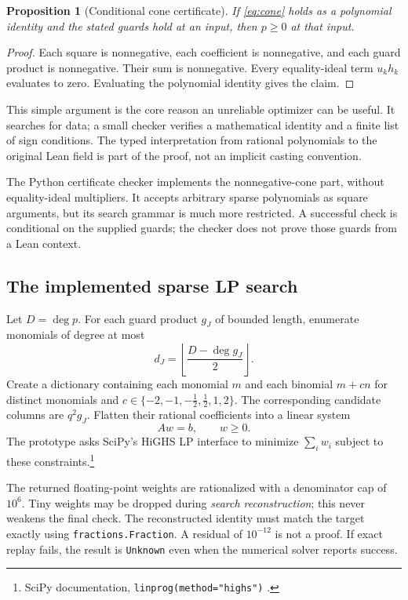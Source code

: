 \documentclass[11pt,a4paper]{article}
\newcommand{\code}[1]{\texttt{#1}}
\newtheorem{proposition}{Proposition}[section]
\begin{document}
\begin{proposition}[Conditional cone certificate]
If \eqref{eq:cone} holds as a polynomial identity and the stated guards hold at
an input, then $p\ge0$ at that input.
\end{proposition}
\begin{proof}
Each square is nonnegative, each coefficient is nonnegative, and each guard
product is nonnegative. Their sum is nonnegative. Every equality-ideal term
$u_kh_k$ evaluates to zero. Evaluating the polynomial identity gives the claim.
\end{proof}

This simple argument is the core reason an unreliable optimizer can be useful.
It searches for data; a small checker verifies a mathematical identity and a
finite list of sign conditions. The typed interpretation from rational
polynomials to the original Lean field is part of the proof, not an implicit
casting convention.

The Python certificate checker implements the nonnegative-cone part, without
equality-ideal multipliers. It accepts arbitrary sparse polynomials as square
arguments, but its search grammar is much more restricted. A successful check
is conditional on the supplied guards; the checker does not prove those guards
from a Lean context.

\subsection{The implemented sparse LP search}
Let $D=\deg p$. For each guard product $g_J$ of bounded length, enumerate
monomials of degree at most
\[
 d_J=\left\lfloor\frac{D-\deg g_J}{2}\right\rfloor.
\]
Create a dictionary containing each monomial $m$ and each binomial
$m+cn$ for distinct monomials and
$c\in\{-2,-1,-\tfrac12,\tfrac12,1,2\}$. The corresponding candidate columns
are $q^2g_J$. Flatten their rational coefficients into a linear system
\[
 Aw=b,\qquad w\ge0.
\]
The prototype asks SciPy's HiGHS LP interface to minimize $\sum_iw_i$ subject
to these constraints.\footnote{SciPy documentation,
\code{linprog(method="highs")} \cite{highs}.}

The returned floating-point weights are rationalized with a denominator cap
of $10^6$. Tiny weights may be dropped during \emph{search reconstruction};
this never weakens the final check. The reconstructed identity must match the
target exactly using \code{fractions.Fraction}. A residual of $10^{-12}$ is
not a proof. If exact replay fails, the result is \code{Unknown} even when the
numerical solver reports success.
\end{document}
